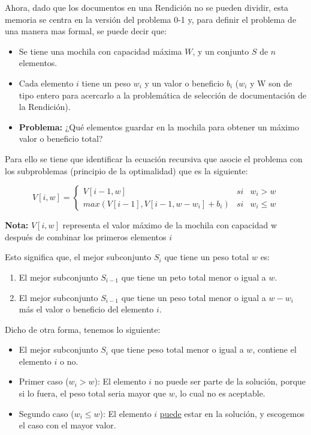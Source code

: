Ahora, dado que los documentos en una Rendición no se pueden dividir, esta memoria se centra en la versión del problema 0-1 y, para definir el problema de una manera mas formal, se puede decir que:

\begin{itemize}
    \item Se tiene una mochila con capacidad máxima $W$, y un conjunto $S$ de $n$ elementos.
    \item Cada elemento $i$ tiene un peso $w_i$ y un valor o beneficio $b_i$ ($w_i$ y W son de tipo entero para acercarlo a la problemática de selección de documentación de la Rendición).
    \item \textbf{Problema:} ¿Qué elementos guardar en la mochila para obtener un máximo valor o beneficio total?
\end{itemize}

Para ello se tiene que identificar la ecuación recursiva que asocie el problema con los subproblemas (principio de la optimalidad) que es la siguiente:

\begin{equation}
    V[i,w]  = \left\lbrace
    \begin{array}{lcc}
        V[i-1,w] & si & w_i>w\\
        max(V[i-1],V[i-1,w-w_i]+b_i) & si & w_i \leq w
    \end{array}
    \right.
\end{equation}

\textbf{Nota:} $V[i,w]$ representa el valor máximo de la mochila con capacidad w después de combinar los primeros elementos $i$

Esto significa que, el mejor subconjunto $S_i$ que tiene un peso total $w$ es:

\begin{enumerate}
    \item El mejor subconjunto $S_{i-1}$ que tiene un peto total menor o igual a $w$.
    \item El mejor subconjunto $S_{i-1}$ que tiene un peso total menor o igual a $w-w_i$ más el valor o beneficio del elemento $i$.
\end{enumerate}

Dicho de otra forma, tenemos lo siguiente:
\begin{itemize}
    \item El mejor subconjunto $S_i$ que tiene peso total menor o igual a $w$, contiene el elemento $i$ o no.
    \item Primer caso ($w_i>w$): El elemento $i$ no puede ser parte de la solución, porque si lo fuera, el peso total seria mayor que $w$, lo cual no es aceptable.
    \item Segundo caso ($w_i \leq w$): El elemento $i$ \underline{puede} estar en la solución, y escogemos el caso con el mayor valor.
\end{itemize}

